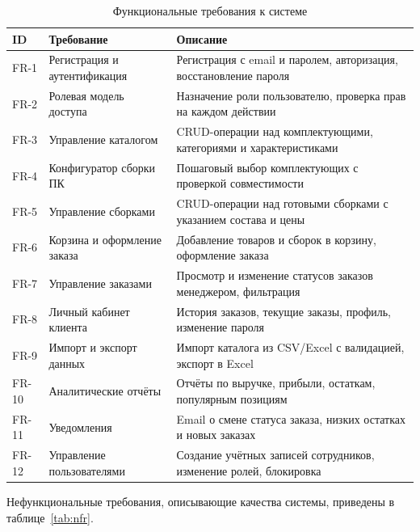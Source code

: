 \documentclass[14pt, a4paper]{extarticle}
\begin{document}
\begin{table}[ht!]
\caption{Функциональные требования к системе}
\label{tab:fr}
\small
\begin{tabularx}{\textwidth}{|>{\centering\arraybackslash}p{}|>{\RaggedRight\arraybackslash}p{}|>{\RaggedRight\arraybackslash}X|}
\hline
\textbf{ID} & \textbf{Требование} & \textbf{Описание} \\ \hline
FR-1 & Регистрация и аутентификация & Регистрация с email и паролем, авторизация, восстановление пароля \\ \hline
FR-2 & Ролевая модель доступа & Назначение роли пользователю, проверка прав на каждом действии \\ \hline
FR-3 & Управление каталогом & CRUD-операции над комплектующими, категориями и характеристиками \\ \hline
FR-4 & Конфигуратор сборки ПК & Пошаговый выбор комплектующих с проверкой совместимости \\ \hline
FR-5 & Управление сборками & CRUD-операции над готовыми сборками с указанием состава и цены \\ \hline
FR-6 & Корзина и оформление заказа & Добавление товаров и сборок в корзину, оформление заказа \\ \hline
FR-7 & Управление заказами & Просмотр и изменение статусов заказов менеджером, фильтрация \\ \hline
FR-8 & Личный кабинет клиента & История заказов, текущие заказы, профиль, изменение пароля \\ \hline
FR-9 & Импорт и экспорт данных & Импорт каталога из CSV/Excel с валидацией, экспорт в Excel \\ \hline
FR-10 & Аналитические отчёты & Отчёты по выручке, прибыли, остаткам, популярным позициям \\ \hline
FR-11 & Уведомления & Email о смене статуса заказа, низких остатках и новых заказах \\ \hline
FR-12 & Управление пользователями & Создание учётных записей сотрудников, изменение ролей, блокировка \\ \hline
\end{tabularx}
\end{table}

Нефункциональные требования, описывающие качества системы, приведены в таблице~\ref{tab:nfr}.
\end{document}
